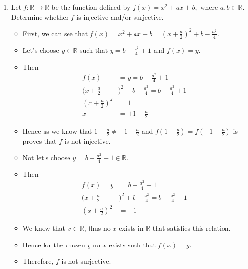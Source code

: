 \documentclass[letterpaper,12pt]{article}
\begin{document}
\begin{enumerate}
	\item Let $f: \mathbb{R} \rightarrow \mathbb{R}$ be the function defined by $f(x) = x^2+ax+b,$ where $a,b \in \mathbb{R}$. Determine whether $f$ is injective and/or surjective.
	\begin{itemize}
		\item First, we can see that $f(x) = x^2+ax+b = (x+\frac{a}{2})^2+b-\frac{a^2}{4}$.
		\item Let's choose $y \in \mathbb{R}$ such that $y = b-\frac{a^2}{4}+1$ and $f(x) =y$.
		\item Then 
		\begin{align}
			f(x) &= y=b-\frac{a^2}{4	}+1 \\ (x+\frac{a}{2}&)^2+b-\frac{a^2}{4} = b-\frac{a^2}{4}+1 \\ (x+\frac{a}{2})^2 &=1 \\ x&=\pm 1 -\frac{a}{2}
		\end{align}
		\item Hence as we know that $1-\frac{a}{2} \neq -1 -\frac{a}{2}$ and $f(1-\frac{a}{2})  = f(-1 -\frac{a}{2})$ is proves that $f$ is not injective.
		\item Not let's choose $y = b-\frac{a^2}{4}-1 \in \mathbb{R}$.
		\item Then
		\begin{align}
			f(x) =y &= b-\frac{a^2}{4}-1\\(x+\frac{a}{2}&)^2+b-\frac{a^2}{4} =b-\frac{a^2}{4}-1 \\ (x+\frac{a}{2})^2 &= -1
		\end{align}
		\item We know that $x \in \mathbb{R}$, thus no $x$ exists in $\mathbb{R}$ that satisfies this relation.
		\item Hence for the chosen $y$ no $x$ exists such that $f(x) =y$.
		\item Therefore, $f$ is not surjective.
	

\end{itemize}
\end{enumerate}
\end{document}
